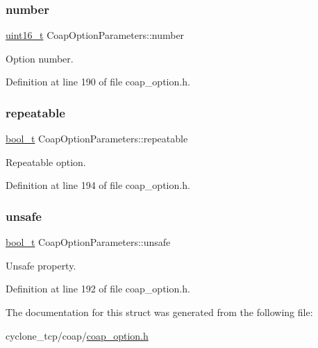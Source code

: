 \subsubsection{\texorpdfstring{number}{number}}
{\footnotesize\ttfamily \hyperlink{stdint_8h_a273cf69d639a59973b6019625df33e30}{uint16\+\_\+t} Coap\+Option\+Parameters\+::number}



Option number. 



Definition at line 190 of file coap\+\_\+option.\+h.

\mbox{\label{structCoapOptionParameters_abcdabdb74a439a64a977e6fd758d91d8}} 
\subsubsection{\texorpdfstring{repeatable}{repeatable}}
{\footnotesize\ttfamily \hyperlink{compiler__port_8h_a812d16e5494522586b3784e55d479912}{bool\+\_\+t} Coap\+Option\+Parameters\+::repeatable}



Repeatable option. 



Definition at line 194 of file coap\+\_\+option.\+h.

\mbox{\label{structCoapOptionParameters_af8d4d98ab12734ed72e7f52d0792b75b}} 
\subsubsection{\texorpdfstring{unsafe}{unsafe}}
{\footnotesize\ttfamily \hyperlink{compiler__port_8h_a812d16e5494522586b3784e55d479912}{bool\+\_\+t} Coap\+Option\+Parameters\+::unsafe}



Unsafe property. 



Definition at line 192 of file coap\+\_\+option.\+h.



The documentation for this struct was generated from the following file\+:\begin{DoxyCompactItemize}
\item 
cyclone\+\_\+tcp/coap/\hyperlink{coap__option_8h}{coap\+\_\+option.\+h}\end{DoxyCompactItemize}
